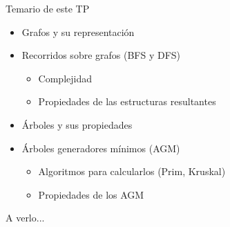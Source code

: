 \documentclass{beamer}
\begin{document}
\begin{frame}{Temario de este TP}
    \begin{itemize}
        \item Grafos y su representación
        \item Recorridos sobre grafos (BFS y DFS)
        \begin{itemize}
            \item Complejidad
            \item Propiedades de las estructuras resultantes
        \end{itemize}
        \item Árboles y sus propiedades
        \item Árboles generadores mínimos (AGM)
        \begin{itemize}
            \item Algoritmos para calcularlos (Prim, Kruskal)
            \item Propiedades de los AGM
        \end{itemize}
    \end{itemize}
\end{frame}


\begin{frame}{A verlo...}
\end{frame}


\begin{frame}
    \Huge \centering {}
\end{frame}
\end{document}
